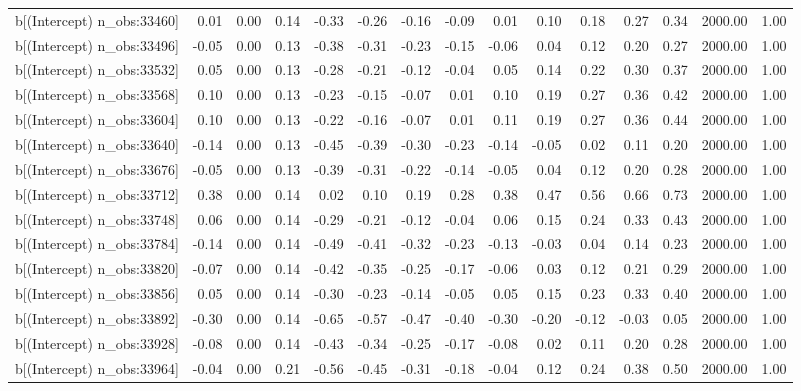 \begin{table}[ht]
\begin{tabular}{rrrrrrrrrrrrrrr}
  b[(Intercept) n\_obs:33460] & 0.01 & 0.00 & 0.14 & -0.33 & -0.26 & -0.16 & -0.09 & 0.01 & 0.10 & 0.18 & 0.27 & 0.34 & 2000.00 & 1.00 \\ 
  b[(Intercept) n\_obs:33496] & -0.05 & 0.00 & 0.13 & -0.38 & -0.31 & -0.23 & -0.15 & -0.06 & 0.04 & 0.12 & 0.20 & 0.27 & 2000.00 & 1.00 \\ 
  b[(Intercept) n\_obs:33532] & 0.05 & 0.00 & 0.13 & -0.28 & -0.21 & -0.12 & -0.04 & 0.05 & 0.14 & 0.22 & 0.30 & 0.37 & 2000.00 & 1.00 \\ 
  b[(Intercept) n\_obs:33568] & 0.10 & 0.00 & 0.13 & -0.23 & -0.15 & -0.07 & 0.01 & 0.10 & 0.19 & 0.27 & 0.36 & 0.42 & 2000.00 & 1.00 \\ 
  b[(Intercept) n\_obs:33604] & 0.10 & 0.00 & 0.13 & -0.22 & -0.16 & -0.07 & 0.01 & 0.11 & 0.19 & 0.27 & 0.36 & 0.44 & 2000.00 & 1.00 \\ 
  b[(Intercept) n\_obs:33640] & -0.14 & 0.00 & 0.13 & -0.45 & -0.39 & -0.30 & -0.23 & -0.14 & -0.05 & 0.02 & 0.11 & 0.20 & 2000.00 & 1.00 \\ 
  b[(Intercept) n\_obs:33676] & -0.05 & 0.00 & 0.13 & -0.39 & -0.31 & -0.22 & -0.14 & -0.05 & 0.04 & 0.12 & 0.20 & 0.28 & 2000.00 & 1.00 \\ 
  b[(Intercept) n\_obs:33712] & 0.38 & 0.00 & 0.14 & 0.02 & 0.10 & 0.19 & 0.28 & 0.38 & 0.47 & 0.56 & 0.66 & 0.73 & 2000.00 & 1.00 \\ 
  b[(Intercept) n\_obs:33748] & 0.06 & 0.00 & 0.14 & -0.29 & -0.21 & -0.12 & -0.04 & 0.06 & 0.15 & 0.24 & 0.33 & 0.43 & 2000.00 & 1.00 \\ 
  b[(Intercept) n\_obs:33784] & -0.14 & 0.00 & 0.14 & -0.49 & -0.41 & -0.32 & -0.23 & -0.13 & -0.03 & 0.04 & 0.14 & 0.23 & 2000.00 & 1.00 \\ 
  b[(Intercept) n\_obs:33820] & -0.07 & 0.00 & 0.14 & -0.42 & -0.35 & -0.25 & -0.17 & -0.06 & 0.03 & 0.12 & 0.21 & 0.29 & 2000.00 & 1.00 \\ 
  b[(Intercept) n\_obs:33856] & 0.05 & 0.00 & 0.14 & -0.30 & -0.23 & -0.14 & -0.05 & 0.05 & 0.15 & 0.23 & 0.33 & 0.40 & 2000.00 & 1.00 \\ 
  b[(Intercept) n\_obs:33892] & -0.30 & 0.00 & 0.14 & -0.65 & -0.57 & -0.47 & -0.40 & -0.30 & -0.20 & -0.12 & -0.03 & 0.05 & 2000.00 & 1.00 \\ 
  b[(Intercept) n\_obs:33928] & -0.08 & 0.00 & 0.14 & -0.43 & -0.34 & -0.25 & -0.17 & -0.08 & 0.02 & 0.11 & 0.20 & 0.28 & 2000.00 & 1.00 \\ 
  b[(Intercept) n\_obs:33964] & -0.04 & 0.00 & 0.21 & -0.56 & -0.45 & -0.31 & -0.18 & -0.04 & 0.12 & 0.24 & 0.38 & 0.50 & 2000.00 & 1.00 \\ 

\end{tabular}
\end{table}
